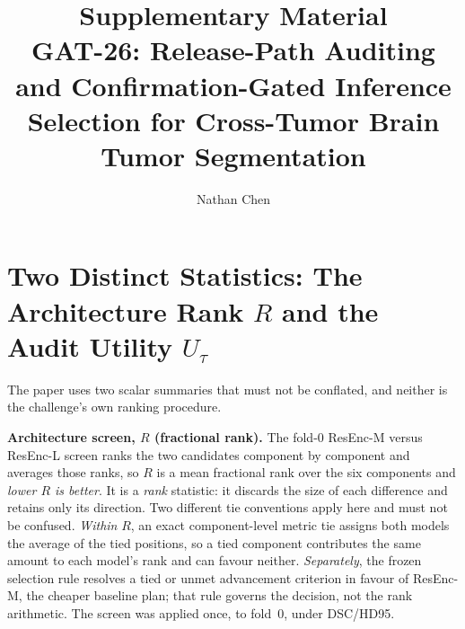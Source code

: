 \documentclass[runningheads]{llncs}
\begin{document}
\title{Supplementary Material\texorpdfstring{\\}{ --- }GAT-26: Release-Path Auditing and Confirmation-Gated
Inference Selection for Cross-Tumor Brain Tumor Segmentation}
\author{Nathan Chen}
\maketitle

\begin{center}\end{center}

\section{Two Distinct Statistics: The Architecture Rank $R$ and the Audit Utility $U_\tau$}

The paper uses two scalar summaries that must not be conflated, and neither is the challenge's own
ranking procedure.

\medskip\noindent\textbf{Architecture screen, $R$ (fractional rank).} The fold-0 ResEnc-M versus
ResEnc-L screen ranks the two candidates component by component and averages those ranks, so $R$ is
a mean fractional rank over the six components and \emph{lower $R$ is better}. It is a \emph{rank}
statistic: it discards the size of each difference and retains only its direction. Two different tie
conventions apply here and must not be confused. \emph{Within} $R$, an exact component-level metric
tie assigns both models the average of the tied positions, so a tied component contributes the same
amount to each model's rank and can favour neither. \emph{Separately}, the frozen selection rule
resolves a tied or unmet advancement criterion in favour of ResEnc-M, the cheaper baseline plan;
that rule governs the decision, not the rank arithmetic. The screen was applied once, to fold~0,
under DSC/HD95.
\end{document}
